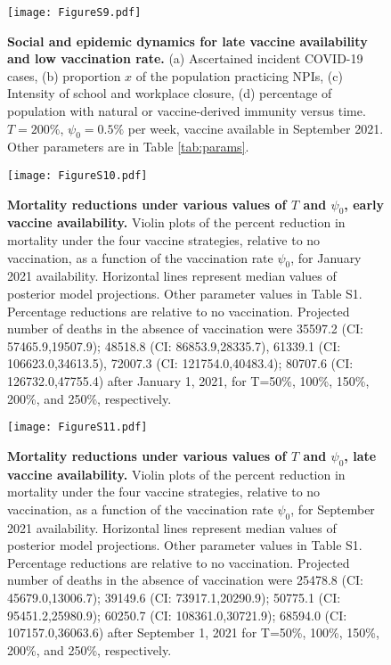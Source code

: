\documentclass[10pt,onecolumn,twoside,lineno]{pnas-new}
\begin{document}
\clearpage 

\begin{figure}[H]
\centering
\texttt{[image: FigureS9.pdf]}
\caption{\textbf{Social and epidemic dynamics for late vaccine availability and low vaccination rate.} (a) Ascertained incident COVID-19 cases, (b) proportion $x$ of the population practicing NPIs, (c) Intensity of school and workplace closure, (d) percentage of population with natural or vaccine-derived immunity versus time. $T=200 \%$, $\psi_0=0.5 \%$ per week, vaccine available in September 2021.   Other parameters are in Table \ref{tab:params}.}
\label{plot_model}
\end{figure}


\clearpage 

\begin{figure}[H]
\centering
\texttt{[image: FigureS10.pdf]}
\caption{\textbf{Mortality reductions under various values of $T$ and $\psi_0$, early vaccine availability.} Violin plots of the percent reduction in mortality under the four vaccine strategies, relative to no vaccination, as a function of the vaccination rate $\psi_0$, for January 2021 availability. Horizontal lines represent median values of posterior model projections. Other parameter values in Table S1.  Percentage reductions are relative to no vaccination.  Projected number of deaths in the absence of vaccination were 35597.2 (CI: 57465.9,19507.9); 48518.8 (CI: 86853.9,28335.7), 61339.1 (CI: 106623.0,34613.5), 
72007.3 (CI: 121754.0,40483.4); 80707.6 (CI: 126732.0,47755.4) after January 1, 2021, for T=50\%, 100\%, 150\%, 200\%, and 250\%, respectively. }
\label{plot_model}
\end{figure}




\clearpage 


\begin{figure}[H]
\centering
\texttt{[image: FigureS11.pdf]}
\caption{\textbf{Mortality reductions under various values of $T$ and $\psi_0$, late vaccine availability.} Violin plots of the percent reduction in mortality under the four vaccine strategies, relative to no vaccination, as a function of the vaccination rate $\psi_0$, for September 2021 availability. Horizontal lines represent median values of posterior model projections. Other parameter values in Table S1.  Percentage reductions are relative to no vaccination. Projected number of deaths in the absence of vaccination were 25478.8 (CI: 45679.0,13006.7); 39149.6 (CI: 73917.1,20290.9); 50775.1 (CI: 95451.2,25980.9); 60250.7 (CI: 108361.0,30721.9); 68594.0 (CI: 107157.0,36063.6) after September 1, 2021 for T=50\%, 100\%, 150\%, 200\%, and 250\%, respectively. }
\label{plot_model}
\end{figure}
\end{document}
